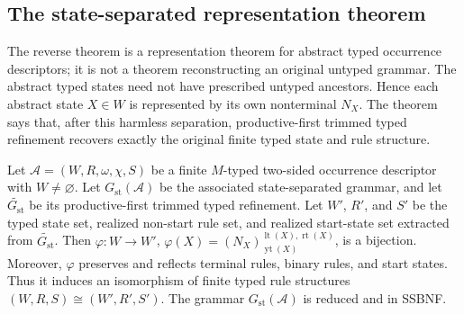 \documentclass[sub]{jalc}
\newcommand{\yt}{\operatorname{yt}}
\newcommand{\lt}{\operatorname{lt}}
\newcommand{\rt}{\operatorname{rt}}
\begin{document}
\subsection{The state-separated representation theorem}
\label{subsec:inverse-representation-theorem}

The reverse theorem is a representation theorem for abstract typed occurrence descriptors; it is not a theorem reconstructing an original untyped grammar. The abstract typed states need not have prescribed untyped ancestors. Hence each abstract state \(X\in W\) is represented by its own nonterminal \(N_X\). The theorem says that, after this harmless separation, productive-first trimmed typed refinement recovers exactly the original finite typed state and rule structure.

\begin{theorem}
\label{thm:state-separated-inverse}
Let \(\mathcal A=(W,R,\omega,\chi,S)\) be a finite \(M\)-typed two-sided occurrence descriptor with \(W\neq\varnothing\). Let \(G_{\mathrm{st}}(\mathcal A)\) be the associated state-separated grammar, and let \(\widetilde{G_{\mathrm{st}}}\) be its productive-first trimmed typed refinement. Let \(W'\), \(R'\), and \(S'\) be the typed state set, realized non-start rule set, and realized start-state set extracted from \(\widetilde{G_{\mathrm{st}}}\). Then \(\varphi:W\to W'\), \(\varphi(X)=(N_X)_{\yt(X)}^{\lt(X),\rt(X)}\), is a bijection. Moreover, \(\varphi\) preserves and reflects terminal rules, binary rules, and start states. Thus it induces an isomorphism of finite typed rule structures \((W,R,S)\cong (W',R',S')\). The grammar \(G_{\mathrm{st}}(\mathcal A)\) is reduced and in SSBNF.
\end{theorem}
\end{document}

